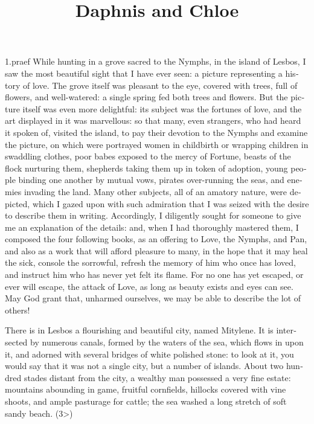 \documentclass{book}
\begin{document}
\title{Daphnis and Chloe}
\date{}

\maketitle



\begin{pairs}

\begin{Rightside} 

\begin{english}
\beginnumbering
\pstart
1.praef  While hunting in a grove sacred to the Nymphs, in the island of Lesbos, I saw the most beautiful sight that I have ever seen: a picture representing a history of love.  The grove itself was pleasant to the eye, covered with trees, full of flowers, and well-watered: a single spring fed both trees and flowers.  But the picture itself was even more delightful: its subject was the fortunes of love, and the art displayed in it was marvellous: so that many, even strangers, who had heard it spoken of, visited the island, to pay their devotion to the Nymphs and examine the picture, on which were portrayed women in childbirth or wrapping children in swaddling clothes, poor babes exposed to the mercy of Fortune, beasts of the flock nurturing them, shepherds taking them up in token of adoption, young people binding one another by mutual vows, pirates over-running the seas, and enemies invading the land. Many other subjects, all of an amatory nature, were depicted, which I gazed upon with such admiration that I was seized with the desire to describe them in writing.  Accordingly, I diligently sought for someone to give me an explanation of the details: and, when I had thoroughly mastered them, I composed the four following books, as an offering to Love, the Nymphs, and Pan, and also as a work that will afford pleasure to many, in the hope that it may heal the sick, console the sorrowful, refresh the memory of him who once has loved, and instruct him who has never yet felt its flame.  For no one has yet escaped, or ever will escape, the attack of Love, as long as beauty exists and eyes can see.  May God grant that, unharmed ourselves, we may be able to describe the lot of others!
\pend


  There is in Lesbos a flourishing and beautiful city, named Mitylene.  It is intersected by numerous canals, formed by the waters of the sea, which flows in upon it, and adorned with several bridges of white polished stone: to look at it, you would say that it was not a single city, but a number of islands.  About two hundred stades distant from the city, a wealthy man possessed a very fine estate: mountains abounding in game, fruitful cornfields, hillocks covered with vine shoots, and ample pasturage for cattle; the sea washed a long stretch of soft sandy beach.  (3>)
\pend



\end{english}
\end{Rightside}
\end{pairs}
\end{document}
